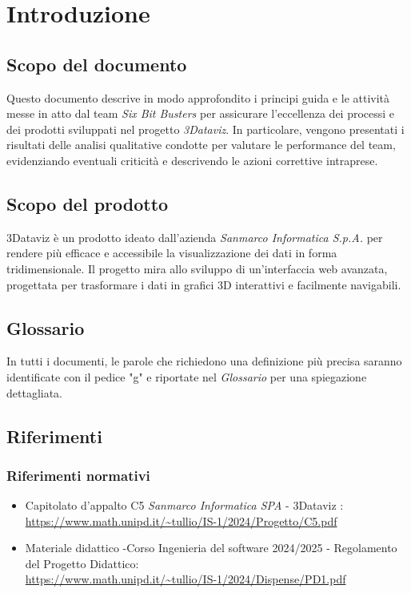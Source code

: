 \section{Introduzione}
    \subsection{Scopo del documento}
        Questo documento descrive in modo approfondito i principi guida e le attività messe in atto dal team \textit{Six Bit Busters} 
        per assicurare l'eccellenza dei processi e dei prodotti sviluppati nel progetto \textit{3Dataviz}. In particolare, vengono 
        presentati i risultati delle analisi qualitative condotte per valutare le performance del team, evidenziando eventuali 
        criticità e descrivendo le azioni correttive intraprese.

    \subsection{Scopo del prodotto}

   3Dataviz è un prodotto ideato dall'azienda \textit{Sanmarco Informatica S.p.A.} per rendere più efficace e accessibile la visualizzazione dei dati in forma tridimensionale. Il progetto mira allo sviluppo di un’interfaccia web avanzata, progettata per trasformare i dati in grafici 3D interattivi e facilmente navigabili.
        
    \subsection{Glossario}
      In tutti i documenti, le parole che richiedono una definizione più precisa saranno identificate con il pedice "g" e riportate nel \textit{Glossario} per una spiegazione dettagliata.
        
    \subsection{Riferimenti}
        \subsubsection{Riferimenti normativi}
        \begin{itemize}
            \item Capitolato d'appalto C5 \textit{Sanmarco Informatica SPA} - 3Dataviz : \\ \url{https://www.math.unipd.it/~tullio/IS-1/2024/Progetto/C5.pdf}
            \item Materiale didattico -Corso Ingenieria del software 2024/2025 - Regolamento del Progetto Didattico: \\ \url{https://www.math.unipd.it/~tullio/IS-1/2024/Dispense/PD1.pdf}
        \end{itemize}
